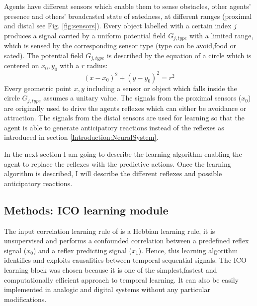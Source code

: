 Agents have different sensors which enable them to sense
obstacles, other agents' presence and others' broadcasted state of satedness, at
different ranges (proximal and distal see Fig. \ref{fig:sensors}).
Every object labelled with a certain index $j$ produces a signal carried by a
uniform potential field $G_{j,type}$ with a limited range, which is sensed
by the corresponding sensor type (type can be avoid,food or sated).
The potential field $G_{j,type}$ is described by the equation of a circle which is centered
on $x_0,y_0$ with a $r$ radius:
\begin{equation}
(x-x_0)^2+(y-y_0)^2=r^2 \label{eq:circle}
\end{equation}
Every geometric point $x,y$ including a sensor or object which falls inside 
the circle $G_{j,type}$ assumes a unitary value.
The signals from the proximal sensors ($x_{0}$) are originally used to drive
the agents reflexes which can either be avoidance or attraction. The signals
from the distal sensors are used for learning so that the agent is able to
generate anticipatory reactions instead of the reflexes as introduced in section \ref{Introduction:NeuralSystem}.

In the next section I am going to describe the learning algorithm enabling the agent to
replace the reflexes with the predictive actions.
Once the learning algorithm is described, I will describe the different reflexes and possible
anticipatory reactions.
\subsection{Methods: ICO learning module}
\label{Section:ICOlearning}
The input correlation learning rule of \citet{Porr2006ICO} is a Hebbian learning rule,
it is unsupervised and performs a confounded correlation between a predefined reflex signal
($x_{0}$) and a reflex predicting signal ($x_{1}$). Hence, this learning
algorithm identifies and exploits causalities between temporal
sequential signals.
The ICO learning block was chosen because it is one of the simplest,fastest and computationally 
efficient approach to temporal learning.
It can also be easily implemented in analogic and digital systems without any
 particular modifications.

